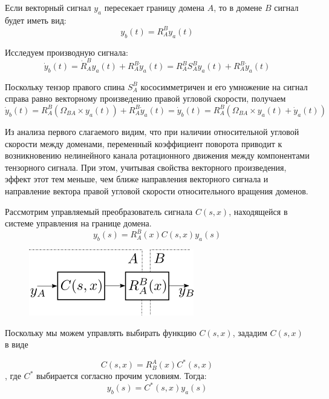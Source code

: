 \documentclass[a4paper]{article}
\begin{document}
Если векторный сигнал $y_a$ пересекает границу домена $A$, то в домене $B$ сигнал будет иметь вид:
\begin{equation} y_b(t) = R_A^B y_a(t) \end{equation}

Исследуем производную сигнала:
\begin{equation} \dot{y}_b(t) = \dot{R}_A^B y_a(t) + R_A^B \dot{y}_a(t) = 
R_A^B S_A^B y_a(t) + R_A^B \dot{y}_a(t) \end{equation}

Поскольку тензор правого спина $S_A^B$ кососимметричен и его умножение на сигнал справа равно векторному произведению правой угловой скорости, получаем
\begin{equation} \dot{y}_b(t) = R_A^B (\Omega_{BA} \times y_a(t)) + R_A^B \dot{y}_a(t) = \dot{y}_b(t) = R_A^B(\Omega_{BA} \times y_a(t) + \dot{y}_a(t))\end{equation}

Из анализа первого слагаемого видим, что при наличии относительной угловой скорости между доменами, переменный коэффициент поворота приводит к возникновению нелинейного канала ротационного движения между компонентами тензорного сигнала. При этом, учитывая свойства векторного произведения, эффект этот тем меньше, чем ближе направления векторного сигнала и направление вектора правой угловой скорости относительного вращения доменов.  

Рассмотрим управляемый преобразователь сигнала $C(s,x)$, находящейся в системе управления на границе домена.
\begin{equation} y_b(s) = R_A^B(x) C(s,x) y_a(s) \end{equation}

{
\begin{figure}[H]
\centering
\includegraphics{./src/domens.png}
\end{figure}
}

Поскольку мы можем управлять выбирать функцию $C(s,x)$, зададим $C(s,x)$ в виде

\begin{equation} \label{kcomp} C(s,x) = R_B^A(x) C^*(s,x) \end{equation}
, где $C^*$ выбирается согласно прочим условиям. Тогда:
\begin{equation} y_b(s) = C^*(s,x) y_a(s) \end{equation} 
\end{document}
